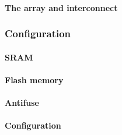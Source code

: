 \paragraph{The array and interconnect}
\label{fpga:deviceArchitecture:arrayAndInterconnect}

\subsubsection{Configuration}
\label{fpga:deviceArchitecture:conf}

\paragraph{\gls{SRAM}}
\label{fpga:deviceArchitecture:sram}

\paragraph{Flash memory}
\label{fpga:deviceArchitecture:flash}

\paragraph{Antifuse}
\label{fpga:deviceArchitecture:antifuse}

\paragraph{Configuration}
\label{fpga:deviceArchitecture:conf}
